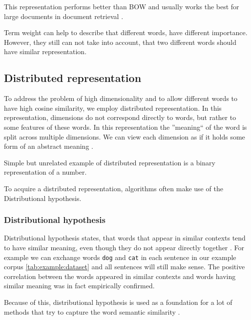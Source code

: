     This representation performs better than BOW and usually works the best for large documents in document retrieval \cite{li2014semantic}.
    
    Term weight can help to describe that different words, have different importance.
    However, they still can not take into account, that two different words should have similar representation.
    
    
    \subsection{Distributed representation}
    
    To address the problem of high dimensionality and to allow different words to have high cosine similarity, we employ distributed representation.
    In this representation, dimensions do not correspond directly to words, but rather to some features of these words.
    In this representation the ''meaning`` of the word is split across multiple dimensions.
    We can view each dimension as if it holds some form of an abstract meaning \cite{le2014distributed}. 
    
    Simple but unrelated example of distributed representation is a binary representation of a number.
    
    To acquire a distributed representation, algorithms often make use of the Distributional hypothesis.
    \* %

    \subsubsection{Distributional hypothesis}
    
    Distributional hypothesis states, that words that appear in similar contexts tend to have similar meaning,
    even though they do not appear directly together \cite{harris1954distributional} \cite{Rubenstein:1965:CCS:365628.365657}. %
    For example we can exchange words \texttt{dog} and \texttt{cat} in each sentence in our example corpus \ref{tab:example:dataset}
    and all sentences will still make sense. 
    The positive correlation between the words appeared in similar contexts and words having similar meaning was in fact empirically confirmed.
    
    Because of this, distributional hypothesis is used as a foundation for a lot of methods that try to capture the word semantic similarity \cite{rubenstein1965contextual}. 

